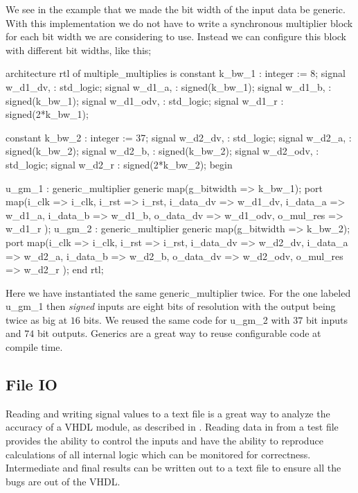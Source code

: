 We see in the example that we made the bit width of the input data be generic. With this implementation we do not have to write a synchronous multiplier block for each bit width we are considering to use. Instead we can configure this block with different bit widths, like this;

\begin{VHDLlisting}[tabsize=4]
architecture rtl of multiple_multiplies is
    constant k_bw_1    : integer := 8;
    signal w_d1_dv,    : std_logic;
    signal w_d1_a,     : signed(k_bw_1);
    signal w_d1_b,     : signed(k_bw_1);
    signal w_d1_odv,   : std_logic;
    signal w_d1_r      : signed(2*k_bw_1);
    
    constant k_bw_2    : integer := 37;
    signal w_d2_dv,    : std_logic;
    signal w_d2_a,     : signed(k_bw_2);
    signal w_d2_b,     : signed(k_bw_2);
    signal w_d2_odv,   : std_logic;
    signal w_d2_r      : signed(2*k_bw_2);
begin

u_gm_1 : generic_multiplier
generic map(g_bitwidth => k_bw_1);
port map(i_clk      => i_clk,
         i_rst      => i_rst,
         i_data_dv  => w_d1_dv,
         i_data_a   => w_d1_a,
         i_data_b   => w_d1_b,
         o_data_dv  => w_d1_odv,
         o_mul_res  => w_d1_r
);
u_gm_2 : generic_multiplier
generic map(g_bitwidth => k_bw_2);
port map(i_clk      => i_clk,
         i_rst      => i_rst,
         i_data_dv  => w_d2_dv,
         i_data_a   => w_d2_a,
         i_data_b   => w_d2_b,
         o_data_dv  => w_d2_odv,
         o_mul_res  => w_d2_r
);
end rtl;
\end{VHDLlisting}

Here we have instantiated the same generic\_multiplier twice. For the one labeled u\_gm\_1 then \emph{signed} inputs are eight bits of resolution with the output being twice as big at $16$ bits. We reused the same code for u\_gm\_2 with $37$ bit inputs and $74$ bit outputs. Generics are a great way to reuse configurable code at compile time.
	
\subsection{File IO}
\label{sec:fileio}
	
Reading and writing signal values to a text file is a great way to analyze the accuracy of a \ac{VHDL} module, as described in . Reading data in from a test file provides the ability to control the inputs and have the ability to reproduce calculations of all internal logic which can be monitored for correctness. Intermediate and final results can be written out to a text file to ensure all the bugs are out of the \ac{VHDL}. 

